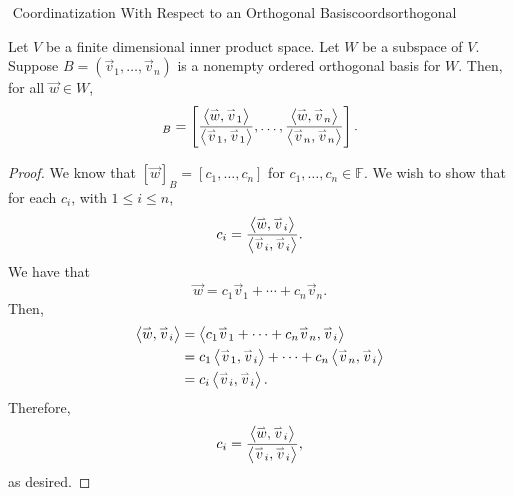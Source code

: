        \begin{theorem}{\Stop\,\,Coordinatization With Respect to an Orthogonal Basis}{coordsorthogonal}

            Let \(V\) be a finite dimensional inner product space. Let \(W\) be a subspace of \(V\). Suppose \(B=(\vec{v}_1,\ldots,\vec{v}_n)\) is a nonempty ordered orthogonal basis for \(W\). Then, for all \(\vec{w}\in W\),
            \begin{equation*}
                [\vec{w}]_B=\left[\frac{\iprod{\vec{w}}{\vec{v}_1}}{\iprod{\vec{v}_1}{\vec{v}_1}},\ldots,\frac{\iprod{\vec{w}}{\vec{v}_n}}{\iprod{\vec{v}_n}{\vec{v}_n}}\right].
            \end{equation*}
            \begin{proof}
                We know that \([\vec{w}]_B=[c_1,\ldots,c_n]\) for \(c_1,\ldots,c_n\in\mathbb{F}\). We wish to show that for each \(c_i\), with \(1\leq i\leq n\),
                \begin{equation*}
                    c_i=\frac{\left\langle \overset{_{\rightharpoonup}}{w},\overset{_{\rightharpoonup}}{v}_i\right\rangle}{\left\langle \overset{_{\rightharpoonup}}{v}_i,\overset{_{\rightharpoonup}}{v}_i\right\rangle}.
                \end{equation*}
                We have that
                \begin{equation*}
                    \vec{w}=c_1\vec{v}_1+\cdots+c_n\vec{v}_n.
                \end{equation*}
                Then,
                \begin{align*}
                    \left\langle \overset{_{\rightharpoonup}}{w},\overset{_{\rightharpoonup}}{v}_i\right\rangle&=\left\langle c_1\overset{_{\rightharpoonup}}{v}_1+\cdots+c_n\overset{_{\rightharpoonup}}{v}_n,\overset{_{\rightharpoonup}}{v}_i\right\rangle \\
                    &=c_1\left\langle \overset{_{\rightharpoonup}}{v}_1,\overset{_{\rightharpoonup}}{v}_i\right\rangle+\cdots+c_n\left\langle \overset{_{\rightharpoonup}}{v}_n,\overset{_{\rightharpoonup}}{v}_i\right\rangle \\
                    &=c_i\left\langle \overset{_{\rightharpoonup}}{v}_i,\overset{_{\rightharpoonup}}{v}_i\right\rangle.
                \end{align*}
                Therefore,
                \begin{equation*}
                    c_i=\frac{\left\langle \overset{_{\rightharpoonup}}{w},\overset{_{\rightharpoonup}}{v}_i\right\rangle}{\left\langle \overset{_{\rightharpoonup}}{v}_i,\overset{_{\rightharpoonup}}{v}_i\right\rangle},
                \end{equation*}
                as desired.
            \end{proof}
        \end{theorem}
